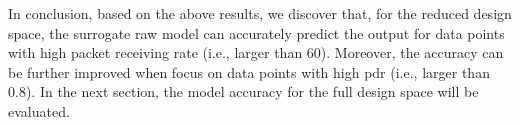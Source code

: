 

 



In conclusion, based on the above results, we discover that, for the reduced design space, the surrogate \gls{raw} model can accurately predict the output for data points with high  packet receiving rate (i.e., larger than 60).
Moreover, the accuracy can be further improved when focus on data points with high \gls{pdr} (i.e., larger than 0.8). In the next section, the model accuracy for the full design space will be evaluated.


